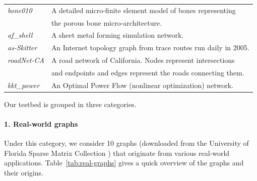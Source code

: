 \begin{table}[t]
\begin{tabular}{ll}
{\it bone010} \cite{vanRietbergen199569} &
A detailed micro-finite element model of bones representing \\
& the porous bone micro-architecture. \\ \hline
{\it af\_shell} \cite{Davis97theuniversity}  & A sheet metal forming simulation network. \\ \hline
{\it as-Skitter} \cite{Leskovec:2005:GOT:1081870.1081893} & An Internet topology graph from trace routes run daily in 2005. \\ \hline %
{\it roadNet-CA} \cite{Leskovec:2005:GOT:1081870.1081893} & A road network of California.
Nodes represent intersections \\ & and endpoints and edges represent the roads connecting them. \\ \hline %
{\it kkt\_power} \cite{Davis97theuniversity} & An Optimal Power Flow (nonlinear optimization) network. \\\hline
\end{tabular}
\end{table}

Our testbed is grouped in three categories.

\paragraph{1. Real-world graphs} 
Under this category, we consider 10 graphs (downloaded from the 
University of Florida Sparse Matrix Collection  \cite{Davis97theuniversity}) that originate
from various real-world applications. Table~\ref{tab:real-graphs} gives a quick overview of the graphs and their origins.
  
